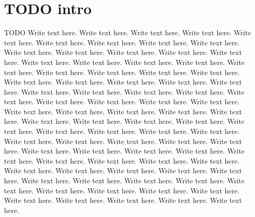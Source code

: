 \section{TODO intro}
TODO
Write text here.  Write text here.  Write text here.  Write text here.
Write text here.  Write text here.  Write text here.  Write text here.
Write text here.  Write text here.  Write text here.  Write text here.
Write text here.  Write text here.  Write text here.  Write text here.
Write text here.  Write text here.  Write text here.  Write text here.
Write text here.  Write text here.  Write text here.  Write text here.
Write text here.  Write text here.  Write text here.  Write text here.
Write text here.  Write text here.  Write text here.  Write text here.
Write text here.  Write text here.  Write text here.  Write text here.
Write text here.  Write text here.  Write text here.  Write text here.
Write text here.  Write text here.  Write text here.  Write text here.
Write text here.  Write text here.  Write text here.  Write text here.
Write text here.  Write text here.  Write text here.  Write text here.
Write text here.  Write text here.  Write text here.  Write text here.
Write text here.  Write text here.  Write text here.  Write text here.
Write text here.  Write text here.  Write text here.  Write text here.
Write text here.  Write text here.  Write text here.  Write text here.
Write text here.  Write text here.  Write text here.  Write text here.
Write text here.  Write text here.  Write text here.  Write text here.
Write text here.  Write text here.  Write text here.  Write text here.
Write text here.  Write text here.  Write text here.  Write text here.


